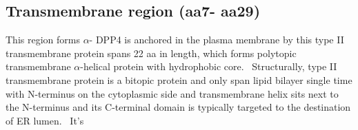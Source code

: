 \subsection{Transmembrane region (aa7- aa29)}

This region forms $\alpha$-
DPP4 is anchored in the plasma membrane by this type II transmembrane protein spans 22 aa in length, which forms polytopic transmembrane $\alpha$-helical protein with hydrophobic core.~\cite{Hong_1990} Structurally, type II transmembrane protein is a bitopic protein and only span lipid bilayer single time with N-terminus on the cytoplasmic side and transmembrane helix sits next to the N-terminus and its C-terminal domain is typically targeted to the destination of ER lumen.~\cite{Luckey} It's  


